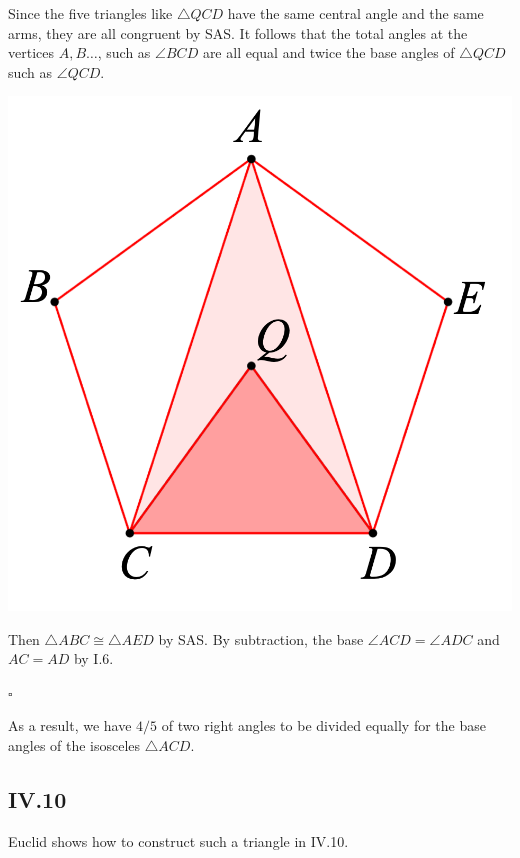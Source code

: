 \documentclass[11pt, oneside]{article}
\begin{document}
Since the five triangles like $\triangle QCD$ have the same central angle and the same arms, they are all congruent by SAS.  It follows that the total angles at the vertices $A,B \dots$, such as $\angle BCD$  are all equal and twice the base angles of $\triangle QCD$ such as $\angle QCD$.  

\begin{center} \includegraphics [scale=0.3] {pent_central_label.png} \end{center}

Then $\triangle ABC \cong \triangle AED$ by SAS.  By subtraction, the base  $\angle ACD = \angle ADC$ and $AC = AD$ by I.6.  

$\square$

 As a result, we have $4/5$ of two right angles to be divided equally for the base angles of the isosceles $\triangle ACD$.

\subsection*{IV.10}

Euclid shows how to construct such a triangle in IV.10.
\end{document}
